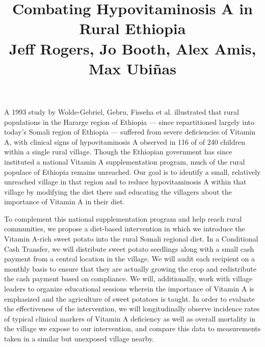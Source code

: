 \documentclass[12pt, letterpaper, draft]{article}
\begin{document}
\title{Combating Hypovitaminosis A in Rural Ethiopia\\ \small{Jeff Rogers, Jo Booth, Alex Amis, Max Ubiñas}}
\author{}
\date{\vspace{-13ex}}
\maketitle

\thispagestyle{empty}
\pagestyle{empty}

A 1993 study by Wolde-Gebriel, Gebru, Fisseha et al. illustrated that rural populations in the Hararge region of Ethiopia --- since repartitioned largely into today's Somali region of Ethiopia --- suffered from severe deficiencies of Vitamin A, with clinical signs of hypovitaminosis A observed in 116 of of 240 children within a single rural village. Though the Ethiopian government has since instituted a national Vitamin A supplementation program, much of the rural populace of Ethiopia remains unreached. Our goal is to identify a small, relatively unreached village in that region and to reduce hypovitaminosis A within that village by modifying the diet there and educating the villagers about the importance of Vitamin A in their diet.

To complement this national supplementation program and help reach rural communities, we propose a diet-based intervention in which we introduce the Vitamin A-rich sweet potato into the rural Somali regional diet. In a Conditional Cash Transfer, we will distribute sweet potato seedlings along with a small cash payment from a central location in the village. We will audit each recipient on a monthly basis to ensure that they are actually growing the crop and redistribute the cash payment based on compliance. We will, additionally, work with village leaders to organize educational sessions wherein the importance of Vitamin A is emphasized and the agriculture of sweet potatoes is taught. In order to evaluate the effectiveness of the intervention, we will longitudinally observe incidence rates of typical clinical markers of Vitamin A deficiency as well as overall mortality in the village we expose to our intervention, and compare this data to measurements taken in a similar but unexposed village nearby. 
\end{document}
